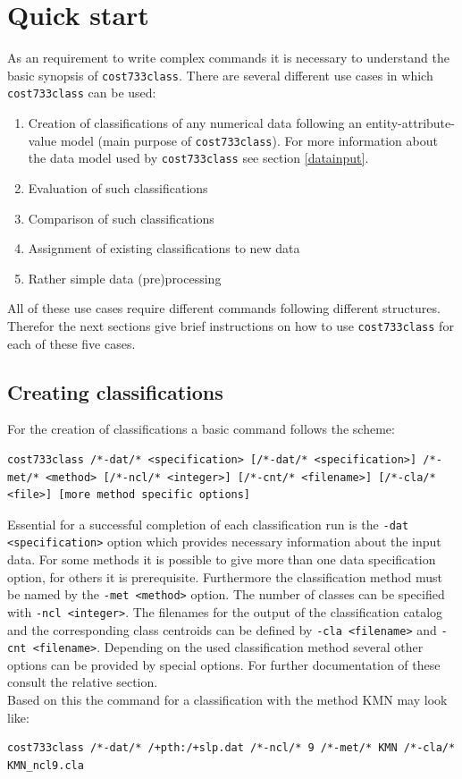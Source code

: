\documentclass[12pt, oneside, a4paper, headsepline, plainheadsepline]{scrbook}
\begin{document}
\section{Quick start}
As an requirement to write complex commands it is necessary to understand the basic synopsis of \verb+cost733class+. There are several different use cases in which \verb+cost733class+ can be used:
\begin{enumerate}
  \item Creation of classifications of any numerical data following an entity-attribute-value model (main purpose of \verb+cost733class+). For more information about the data model used by \verb+cost733class+ see section \ref{datainput}.
  \item Evaluation of such classifications
  \item Comparison of such classifications
  \item Assignment of existing classifications to new data
  \item Rather simple data (pre)processing
\end{enumerate}
All of these use cases require different commands following different structures. Therefor the next sections give brief instructions on how to use \verb+cost733class+ for each of these five cases.

\subsection{Creating classifications}
For the creation of classifications a basic command follows the scheme:
\begin{lstlisting}
cost733class /*-dat/* <specification> [/*-dat/* <specification>] /*-met/* <method> [/*-ncl/* <integer>] [/*-cnt/* <filename>] [/*-cla/* <file>] [more method specific options]
\end{lstlisting}
Essential for a successful completion of each classification run is the \verb+-dat <specification>+ option which provides necessary information about the input data.
For some methods it is possible to give more than one data specification option, for others it is prerequisite. Furthermore the classification method must be named by the \verb+-met <method>+ option.
The number of classes can be specified with \verb+-ncl <integer>+. The filenames for the output of the classification catalog and the corresponding class centroids can be defined by 
\verb+-cla <filename>+ and \verb+-cnt <filename>+. Depending on the used classification method several other options can be provided by special options. For further documentation of these consult the relative section.\\
Based on this the command for a classification with the method KMN may look like:
\begin{lstlisting}
cost733class /*-dat/* /+pth:/+slp.dat /*-ncl/* 9 /*-met/* KMN /*-cla/* KMN_ncl9.cla
\end{lstlisting}
\end{document}
